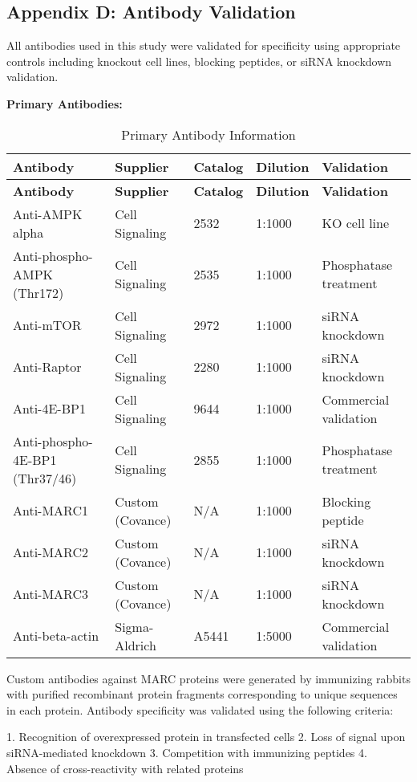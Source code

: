 \documentclass[11pt,a4paper]{article}
\begin{document}
\subsection*{Appendix D: Antibody Validation}

All antibodies used in this study were validated for specificity using appropriate controls including knockout cell lines, blocking peptides, or siRNA knockdown validation.

\textbf{Primary Antibodies:}

\begin{longtable}{|p{2.5cm}|p{2cm}|p{2cm}|p{2cm}|p{3cm}|}
\caption{Primary Antibody Information} \\
\hline
\textbf{Antibody} & \textbf{Supplier} & \textbf{Catalog} & \textbf{Dilution} & \textbf{Validation} \\
\hline
\endfirsthead
\hline
\textbf{Antibody} & \textbf{Supplier} & \textbf{Catalog} & \textbf{Dilution} & \textbf{Validation} \\
\hline
\endhead
Anti-AMPK alpha & Cell Signaling & 2532 & 1:1000 & KO cell line \\
Anti-phospho-AMPK (Thr172) & Cell Signaling & 2535 & 1:1000 & Phosphatase treatment \\
Anti-mTOR & Cell Signaling & 2972 & 1:1000 & siRNA knockdown \\
Anti-Raptor & Cell Signaling & 2280 & 1:1000 & siRNA knockdown \\
Anti-4E-BP1 & Cell Signaling & 9644 & 1:1000 & Commercial validation \\
Anti-phospho-4E-BP1 (Thr37/46) & Cell Signaling & 2855 & 1:1000 & Phosphatase treatment \\
Anti-MARC1 & Custom (Covance) & N/A & 1:1000 & Blocking peptide \\
Anti-MARC2 & Custom (Covance) & N/A & 1:1000 & siRNA knockdown \\
Anti-MARC3 & Custom (Covance) & N/A & 1:1000 & siRNA knockdown \\
Anti-beta-actin & Sigma-Aldrich & A5441 & 1:5000 & Commercial validation \\
\hline
\end{longtable}

Custom antibodies against MARC proteins were generated by immunizing rabbits with purified recombinant protein fragments corresponding to unique sequences in each protein. Antibody specificity was validated using the following criteria:

1. Recognition of overexpressed protein in transfected cells
2. Loss of signal upon siRNA-mediated knockdown
3. Competition with immunizing peptides
4. Absence of cross-reactivity with related proteins
\end{document}
